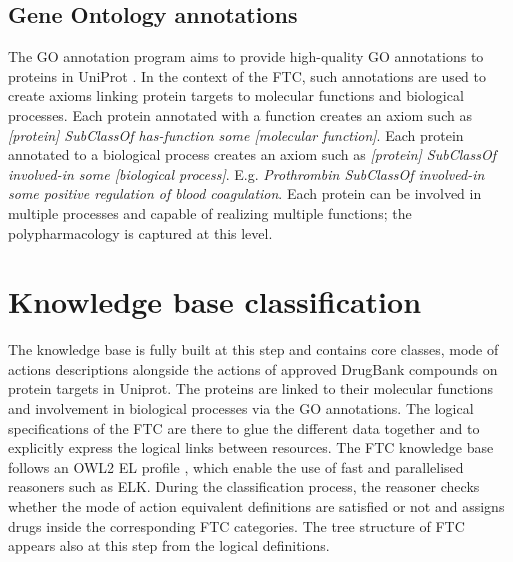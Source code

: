 \documentclass{bioinfo}
\begin{document}
\subsection{Gene Ontology annotations}
The GO annotation program aims to provide high-quality GO annotations to 
proteins in UniProt \citep{Dimmer2012}. In the context of the FTC, such annotations are used 
to create axioms linking protein targets to molecular functions and biological processes. 
Each protein annotated with a function creates an axiom such 
as \emph{[protein] SubClassOf has-function some [molecular function]}. 
Each protein annotated to a biological process creates an axiom such 
as \emph{[protein] SubClassOf involved-in some [biological process]}. 
E.g. \emph{Prothrombin SubClassOf involved-in some positive regulation of blood coagulation}. 
Each protein can be involved in multiple processes and capable of realizing multiple functions;
the polypharmacology is captured at this level.

\section{Knowledge base classification}
The knowledge base is fully built at this step and contains core classes, mode 
of actions descriptions alongside the actions of approved DrugBank compounds on 
protein targets in Uniprot. The proteins are linked to their molecular functions and involvement in 
biological processes via the GO annotations. The logical specifications of the FTC are there to glue 
the different data together and to explicitly express the logical links between resources. The FTC 
knowledge base follows an OWL2 EL profile \citep{Motik2009}, which enable the use of fast and parallelised reasoners such 
as ELK. During the classification process, the reasoner checks whether the mode of action equivalent 
definitions are satisfied or not and assigns drugs inside the corresponding FTC categories. The tree structure 
of FTC appears also at this step from the logical definitions.
\end{document}
